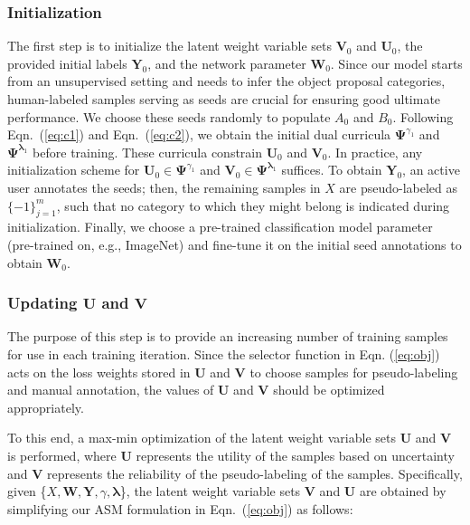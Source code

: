 \documentclass[journal]{IEEEtran}
\begin{document}
\subsubsection{\textbf{Initialization}}
The first step is to initialize the latent weight variable sets $\mathbf{V}_0$ and $\mathbf{U}_0$, the provided initial labels $\mathbf{Y}_0$, and the network parameter $\mathbf{W}_0$. Since our model starts from an unsupervised setting and needs to infer the object proposal categories, human-labeled samples serving as seeds are crucial for ensuring good ultimate performance. We choose these seeds randomly to populate $A_{0}$ and $B_{0}$. Following Eqn.~(\ref{eq:c1}) and Eqn.~(\ref{eq:c2}), we obtain the {initial} dual curricula $\mathbf{\Psi}^{\gamma_1}$ and $\mathbf{\Psi}^{\bm \lambda_1}$ before training. These curricula constrain $\mathbf{U}_0$ and $\mathbf{V}_0$. In practice, any initialization scheme for $\mathbf{U}_0\in\mathbf{\Psi}^{\gamma_1}$ and $\mathbf{V}_0\in\mathbf{\Psi}^{\bm \lambda_1}$ suffices. To obtain $\mathbf{Y}_0$, an active user annotates the seeds; then, the remaining samples in $X$ are pseudo-labeled as $\{-1\}^m_{j=1}$, {such that no} category to which they might belong {is indicated} during initialization. Finally, we choose a pre-trained classification model parameter (pre-trained on, e.g., ImageNet) and fine-tune it on the initial seed annotations to obtain $\mathbf{W}_0$. 



\subsubsection{\textbf{Updating $\mathbf{U}$ and $\mathbf{V}$}}
{The purpose of this step is to provide an increasing number of training samples for use in each training iteration. Since the selector function in Eqn. (\ref{eq:obj}) acts on the loss weights stored in $\mathbf{U}$ and $\mathbf{V}$ to choose samples for pseudo-labeling and manual annotation, the values of $\mathbf{U}$ and $\mathbf{V}$ should be optimized appropriately.}

To this end, a max-min optimization of the latent weight variable sets $\mathbf{U}$ and $\mathbf{V}$ is performed, where $\mathbf{U}$ represents the utility of the samples based on uncertainty and $\mathbf{V}$ represents the reliability of the pseudo-labeling of the samples. Specifically, given \{$X, \mathbf{W}, \mathbf{Y}, \gamma, {\bm \lambda}$\}, the latent weight variable sets $\mathbf{V}$ and $\mathbf{U}$ are obtained by simplifying our {ASM} {formulation} in Eqn.~(\ref{eq:obj}) as follows:
\end{document}
